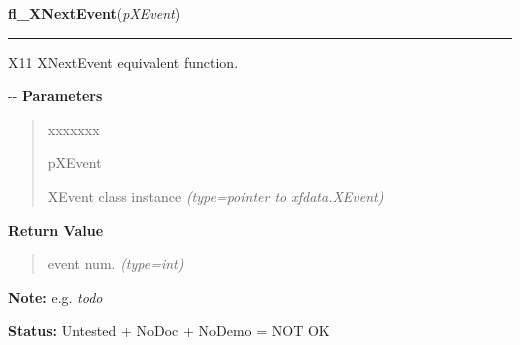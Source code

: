 \hspace{.8\funcindent}\begin{boxedminipage}{\funcwidth}

    \raggedright \textbf{fl\_XNextEvent}(\textit{pXEvent})

    \vspace{-1.5ex}

    \rule{\textwidth}{0.5\fboxrule}
\setlength{\parskip}{2ex}

X11 XNextEvent equivalent function.

-{}-
\setlength{\parskip}{1ex}
      \textbf{Parameters}
      \vspace{-1ex}

      \begin{quote}
        \begin{Ventry}{xxxxxxx}

          \item[pXEvent]


XEvent class instance
            {\it (type=pointer to xfdata.XEvent)}

        \end{Ventry}

      \end{quote}

      \textbf{Return Value}
    \vspace{-1ex}

      \begin{quote}

event num.
      {\it (type=int)}

      \end{quote}

\textbf{Note:} 
e.g. \emph{todo}


\textbf{Status:} 
Untested + NoDoc + NoDemo = NOT OK


    \end{boxedminipage}

    \label{xformslib:flxbasic:fl_XPeekEvent}

    \vspace{0.5ex}

